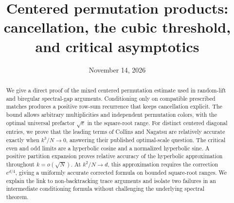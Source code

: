 \documentclass[11pt]{article}
\title{Centered permutation products:\\ cancellation, the cubic threshold,\\ and critical asymptotics}
\author{}
\date{November 14, 2026}
\theoremstyle{definition}
\theoremstyle{remark}
\newcommand{\1}{\mathbf 1}
\begin{document}
\maketitle
\begin{abstract}
We give a direct proof of the mixed centered permutation estimate used in random-lift and biregular spectral-gap arguments. Conditioning only on compatible prescribed matches produces a positive row-sum recurrence that keeps cancellation explicit. The bound allows arbitrary multiplicities and independent permutation colors, with the optimal universal prefactor $\sqrt e$ in the square-root range. For distinct centered diagonal entries, we prove that the leading terms of Collins and Nagatsu are relatively accurate exactly when $k^3/N\to0$, answering their published optimal-scale question. The critical even and odd limits are a hyperbolic cosine and a normalized hyperbolic sine. A positive partition expansion proves relative accuracy of the hyperbolic approximation throughout $k=o(\sqrt N)$. At $k^2/N\to d$, this approximation requires the correction $e^{d/4}$, giving a uniformly accurate corrected formula on bounded square-root ranges. We explain the link to non-backtracking trace arguments and isolate two failures in an intermediate conditioning formula without challenging the underlying spectral theorem.
\end{abstract}
\tableofcontents
\clearpage








\end{document}
